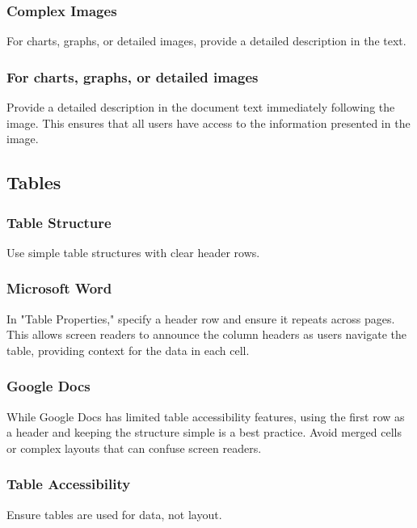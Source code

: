 \subsubsection{Complex Images}\label{ch15:sssec:complex-images}
For charts, graphs, or detailed images, provide a detailed description in the text.

\subsubsection{For charts, graphs, or detailed images}\label{ch15:sssec:charts-etc}
Provide a detailed description in the document text immediately following the image. This ensures that all users have access to the information presented in the image.

\subsection{Tables}\label{ch15:ssec:tables}

\subsubsection{Table Structure}\label{ch15:sssec:table-structure}
Use simple table structures with clear header rows.

\subsubsection{Microsoft Word}\label{ch15:sssec:word-tables}
In "Table Properties," specify a header row and ensure it repeats across pages. This allows screen readers to announce the column headers as users navigate the table, providing context for the data in each cell.

\subsubsection{Google Docs}\label{ch15:sssec:docs-tables}
While Google Docs has limited table accessibility features, using the first row as a header and keeping the structure simple is a best practice. Avoid merged cells or complex layouts that can confuse screen readers.

\subsubsection{Table Accessibility}\label{ch15:sssec:table-accessibility}
Ensure tables are used for data, not layout.

